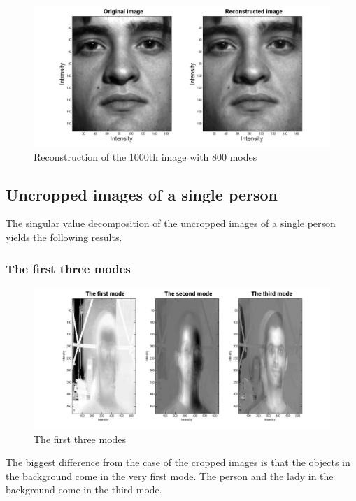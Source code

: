 \documentclass[a4paper]{article}
\begin{document}
\begin{figure}[h!] 
	
	\includegraphics[width=1.\textwidth]{reconall2.jpg}
	
	\caption{Reconstruction of the 1000th image with 800 modes}
\end{figure}
\subsection{Uncropped images of a single person}
The singular value decomposition of the uncropped images of a single person yields the following results.



\subsubsection{The first three modes}
\begin{figure}[h!] 
	
	\includegraphics[width=1.\textwidth]{Uncroppmode.jpg}
	
	\caption{The first three modes}	
\end{figure}
 The biggest difference from the case of the cropped images is that the objects in the background come in the very first mode. The person and the lady in the background come in the third mode.
\end{document}
